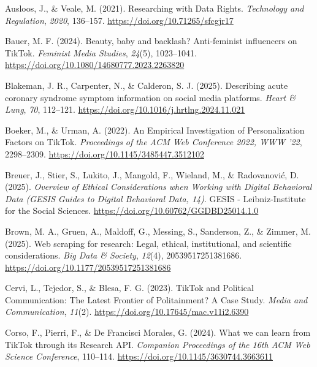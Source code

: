 \documentclass[
  nobib]{ccr}
\newlength{\cslhangindent}
\newenvironment{CSLReferences}[2] %
 {\begin{list}{}{%
  \setlength{\itemindent}{0pt}
  \setlength{\leftmargin}{0pt}
  \setlength{\parsep}{0pt}
  \ifodd #1
   \setlength{\leftmargin}{\cslhangindent}
   \setlength{\itemindent}{-1\cslhangindent}
  \fi
  \setlength{\itemsep}{#2\baselineskip}}}
 {\end{list}}
\begin{document}
\protect{}\label{refs}
\begin{CSLReferences}{1}{0}
Ausloos, J., \& Veale, M. (2021). Researching with {Data} {Rights}.
\emph{Technology and Regulation}, \emph{2020}, 136--157.
\url{https://doi.org/10.71265/sfcgjr17}

Bauer, M. F. (2024). Beauty, baby and backlash? {Anti}-feminist
influencers on {TikTok}. \emph{Feminist Media Studies}, \emph{24}(5),
1023--1041. \url{https://doi.org/10.1080/14680777.2023.2263820}

Blakeman, J. R., Carpenter, N., \& Calderon, S. J. (2025). Describing
acute coronary syndrome symptom information on social media platforms.
\emph{Heart \& Lung}, \emph{70}, 112--121.
\url{https://doi.org/10.1016/j.hrtlng.2024.11.021}

Boeker, M., \& Urman, A. (2022). An {Empirical} {Investigation} of
{Personalization} {Factors} on {TikTok}. \emph{Proceedings of the {ACM}
{Web} {Conference} 2022, {WWW} '22}, 2298--2309.
\url{https://doi.org/10.1145/3485447.3512102}

Breuer, J., Stier, S., Lukito, J., Mangold, F., Wieland, M., \&
Radovanović, D. (2025). \emph{Overview of {Ethical} {Considerations}
when {Working} with {Digital} {Behavioral} {Data} ({GESIS} {Guides} to
{Digital} {Behavioral} {Data}, 14)}. GESIS - Leibniz-Institute for the
Social Sciences. \url{https://doi.org/10.60762/GGDBD25014.1.0}

Brown, M. A., Gruen, A., Maldoff, G., Messing, S., Sanderson, Z., \&
Zimmer, M. (2025). Web scraping for research: {Legal}, ethical,
institutional, and scientific considerations. \emph{Big Data \&
Society}, \emph{12}(4), 20539517251381686.
\url{https://doi.org/10.1177/20539517251381686}

Cervi, L., Tejedor, S., \& Blesa, F. G. (2023). {TikTok} and {Political}
{Communication}: {The} {Latest} {Frontier} of {Politainment}? {A} {Case}
{Study}. \emph{Media and Communication}, \emph{11}(2).
\url{https://doi.org/10.17645/mac.v11i2.6390}

Corso, F., Pierri, F., \& De Francisci Morales, G. (2024). What we can
learn from {TikTok} through its {Research} {API}. \emph{Companion
{Proceedings} of the 16th {ACM} {Web} {Science} {Conference}}, 110--114.
\url{https://doi.org/10.1145/3630744.3663611}


\end{CSLReferences}
\end{document}
